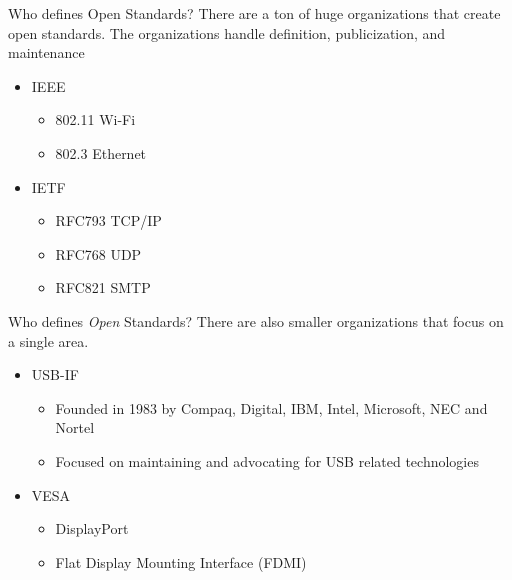 \documentclass{acm}
\begin{document}
\begin{frame}{Who defines Open Standards?}
        There are a ton of huge organizations that create open standards.
        The organizations handle definition, publicization, and  maintenance
        \pause
        \begin{itemize}
                \item IEEE\pause
                        \begin{itemize}
                                \item 802.11 Wi-Fi
                                \item 802.3 Ethernet
                        \end{itemize}\pause
                \item IETF\pause
                        \begin{itemize}
                                \item RFC793 TCP/IP
                                \item RFC768 UDP
                                \item RFC821 SMTP
                        \end{itemize}
        \end{itemize}
\end{frame}
\begin{frame}{Who defines \textit{Open} Standards?}
        There are also smaller organizations that focus on a single area.\pause
        \begin{itemize}
                \item USB-IF\pause
                        \begin{itemize}
                                \item Founded in 1983 by Compaq, Digital, IBM, Intel, Microsoft, NEC and Nortel
                                \item Focused on maintaining and advocating
                                        for USB related technologies
                        \end{itemize}\pause
                \item VESA\pause
                        \begin{itemize}
                                \item DisplayPort
                                \item Flat Display Mounting Interface (FDMI)
                        \end{itemize}
        \end{itemize}
\end{frame}
\end{document}
